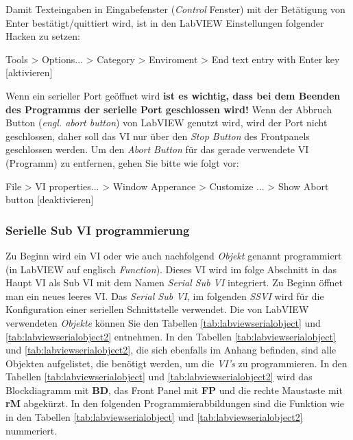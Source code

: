 Damit Texteingaben in Eingabefenster (\textit{Control} Fenster) mit der Betätigung von Enter bestätigt/quittiert wird, ist in den LabVIEW Einstellungen folgender Hacken zu setzen:

\begin{center}  %
Tools > Options... > Category > Enviroment > End text entry with Enter key [aktivieren]
\end{center} 

\noindent Wenn ein serieller Port geöffnet wird \textbf{ist es wichtig, dass bei dem Beenden des Programms der serielle Port geschlossen wird!} Wenn der Abbruch Button (\textit{engl. abort button}) von LabVIEW genutzt wird, wird der Port nicht geschlossen, daher soll das VI nur über den \textit{Stop Button} des Frontpanels geschlossen werden. Um den \textit{Abort Button} für das gerade verwendete VI (Programm) zu entfernen, gehen Sie bitte wie folgt vor:

\begin{center} %
File > VI properties... > Window Apperance > Customize ... >  Show Abort button [deaktivieren]
\end{center} 


 
\subsubsection{Serielle Sub VI programmierung}

Zu Beginn wird ein VI oder wie auch nachfolgend \textit{Objekt} genannt programmiert (in LabVIEW auf englisch \textit{Function}). Dieses VI wird im folge Abschnitt in das Haupt VI als Sub VI mit dem Namen \textit{Serial Sub VI} integriert. Zu Beginn öffnet man ein neues leeres VI. Das \textit{Serial Sub VI}, im folgenden \textit{SSVI} wird für die Konfiguration einer seriellen Schnittstelle verwendet. Die von LabVIEW verwendeten \textit{Objekte} können Sie den Tabellen \ref{tab:labviewserialobject} und \ref{tab:labviewserialobject2} entnehmen. In den Tabellen \ref{tab:labviewserialobject} und \ref{tab:labviewserialobject2}, die sich ebenfalls im Anhang befinden, sind alle Objekten aufgelistet, die benötigt werden, um die \textit{VI's} zu programmieren. In den Tabellen \ref{tab:labviewserialobject} und \ref{tab:labviewserialobject2} wird das Blockdiagramm mit \textbf{BD}, das Front Panel mit \textbf{FP} und die rechte Maustaste mit \textbf{rM} abgekürzt. In den folgenden Programmierabbildungen sind die Funktion wie in den Tabellen \ref{tab:labviewserialobject} und \ref{tab:labviewserialobject2} nummeriert.\\

